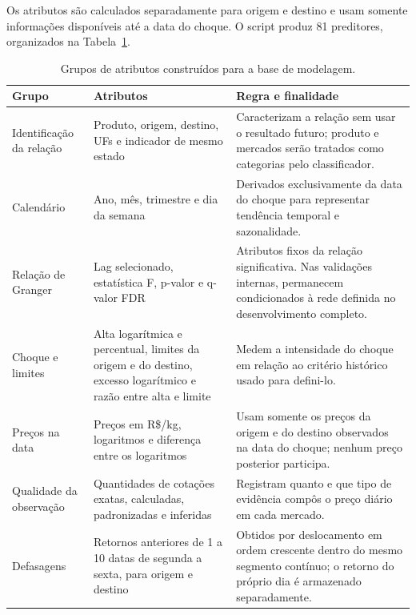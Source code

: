 \documentclass[12pt,a4paper]{article}
\begin{document}
Os atributos são calculados separadamente para origem e destino e usam somente
informações disponíveis até a data do choque. O script produz 81 preditores,
organizados na Tabela~\ref{tab:atributos-modelagem}.

\begin{table}[htbp]
    \centering
    \caption{Grupos de atributos construídos para a base de modelagem.}
    \label{tab:atributos-modelagem}
    \small
    \begin{tabular}{p{3.4cm}p{5.3cm}p{6.0cm}}
        \toprule
        \textbf{Grupo} & \textbf{Atributos} & \textbf{Regra e finalidade} \\
        \midrule
        Identificação da relação &
        Produto, origem, destino, UFs e indicador de mesmo estado &
        Caracterizam a relação sem usar o resultado futuro; produto e mercados
        serão tratados como categorias pelo classificador. \\

        Calendário &
        Ano, mês, trimestre e dia da semana &
        Derivados exclusivamente da data do choque para representar tendência
        temporal e sazonalidade. \\

        Relação de Granger &
        Lag selecionado, estatística F, p-valor e q-valor FDR &
        Atributos fixos da relação significativa. Nas validações internas,
        permanecem condicionados à rede definida no desenvolvimento completo. \\

        Choque e limites &
        Alta logarítmica e percentual, limites da origem e do destino, excesso
        logarítmico e razão entre alta e limite &
        Medem a intensidade do choque em relação ao critério histórico usado
        para defini-lo. \\

        Preços na data &
        Preços em R\$/kg, logaritmos e diferença entre os logaritmos &
        Usam somente os preços da origem e do destino observados na data do
        choque; nenhum preço posterior participa. \\

        Qualidade da observação &
        Quantidades de cotações exatas, calculadas, padronizadas e inferidas &
        Registram quanto e que tipo de evidência compôs o preço diário em cada
        mercado. \\

        Defasagens &
        Retornos anteriores de 1 a 10 datas de segunda a sexta, para origem e destino &
        Obtidos por deslocamento em ordem crescente dentro do mesmo segmento
        contínuo; o retorno do próprio dia é armazenado separadamente. \\


\end{tabular}
\end{table}
\end{document}
